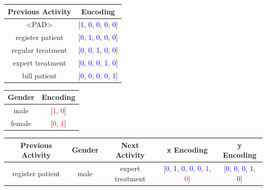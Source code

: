\begin{table}[h!]
    \centering
    \scriptsize
    \renewcommand{\arraystretch}{1.2}
    \setlength{\tabcolsep}{6pt}

    \begin{minipage}{0.55\textwidth}
        \centering
        \begin{tabular}{c | c}
            \toprule
            \textbf{Previous Activity} & \textbf{Encoding} \\
            \midrule
            <PAD> & [\textcolor{blue}{1}, \textcolor{blue}{0}, \textcolor{blue}{0}, \textcolor{blue}{0}, \textcolor{blue}{0}] \\
            register patient & [\textcolor{blue}{0}, \textcolor{blue}{1}, \textcolor{blue}{0}, \textcolor{blue}{0}, \textcolor{blue}{0}] \\
            regular treatment & [\textcolor{blue}{0}, \textcolor{blue}{0}, \textcolor{blue}{1}, \textcolor{blue}{0}, \textcolor{blue}{0}] \\
            expert treatment & [\textcolor{blue}{0}, \textcolor{blue}{0}, \textcolor{blue}{0}, \textcolor{blue}{1}, \textcolor{blue}{0}] \\
            bill patient & [\textcolor{blue}{0}, \textcolor{blue}{0}, \textcolor{blue}{0}, \textcolor{blue}{0}, \textcolor{blue}{1}] \\
            \bottomrule
        \end{tabular}
    \end{minipage}
    \begin{minipage}{0.3\textwidth}
        \centering
        \vspace{0.2cm}
        \begin{tabular}{c | c}
            \toprule
            \textbf{Gender} & \textbf{Encoding} \\
            \midrule
            male & [\textcolor{red}{1}, \textcolor{red}{0}] \\
            female & [\textcolor{red}{0}, \textcolor{red}{1}] \\
            \bottomrule
        \end{tabular}
    \end{minipage}

    \vspace{0.3cm}

    \begin{minipage}{0.7\textwidth}
        \centering
        \begin{tabular}{c | c | c | c | c}
            \toprule
            \textbf{Previous Activity} & \textbf{Gender} & \textbf{Next Activity} & \textbf{x Encoding} & \textbf{y Encoding} \\
            \midrule
            register patient & male & expert treatment & 
            [\textcolor{blue}{0}, \textcolor{blue}{1}, \textcolor{blue}{0}, \textcolor{blue}{0}, \textcolor{blue}{0}, \textcolor{red}{1}, \textcolor{red}{0}] & 
            [\textcolor{blue}{0}, \textcolor{blue}{0}, \textcolor{blue}{0}, \textcolor{blue}{1}, \textcolor{blue}{0}] \\
            

\end{tabular}
\end{minipage}
\end{table}
